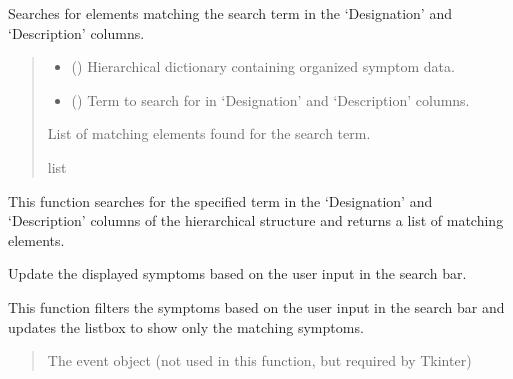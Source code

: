 \documentclass[letterpaper,10pt,english]{sphinxmanual}
\begin{document}
\begin{fulllineitems}
\begin{fulllineitems}
\label{\detokenize{annotation:id1}}
\pysigstartsignatures
{}
\pysigstopsignatures
\sphinxAtStartPar
Searches for elements matching the search term in the ‘Designation’ and ‘Description’ columns.
\begin{quote}\begin{description}
\begin{itemize}
\item {} 
\sphinxAtStartPar
{} () \textendash{} Hierarchical dictionary containing organized symptom data.

\item {} 
\sphinxAtStartPar
{} () \textendash{} Term to search for in ‘Designation’ and ‘Description’ columns.

\end{itemize}

\sphinxAtStartPar
List of matching elements found for the search term.

\sphinxAtStartPar
list

\end{description}\end{quote}

\sphinxAtStartPar
This function searches for the specified term in the ‘Designation’ and ‘Description’ columns
of the hierarchical structure and returns a list of matching elements.

\end{fulllineitems}


\begin{fulllineitems}
\label{\detokenize{annotation:id2}}
\pysigstartsignatures
{}
\pysigstopsignatures
\sphinxAtStartPar
Update the displayed symptoms based on the user input in the search bar.

\sphinxAtStartPar
This function filters the symptoms based on the user input in the
search bar and updates the listbox to show only the matching symptoms.
\begin{quote}\begin{description}
\sphinxAtStartPar
{} \textendash{} The event object (not used in this function, but required by Tkinter)


\end{description}
\end{quote}
\end{fulllineitems}
\end{fulllineitems}
\end{document}
